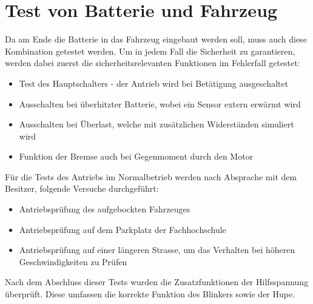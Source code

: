\section{Test von Batterie und Fahrzeug}
Da am Ende die Batterie in das Fahrzeug eingebaut werden soll, muss auch diese Kombination getestet werden. Um in jedem Fall die Sicherheit zu garantieren, werden dabei zuerst die sicherheitsrelevanten Funktionen im Fehlerfall getestet: \begin{itemize}
	\item Test des Hauptschalters - der Antrieb wird bei Betätigung ausgeschaltet
	\item Ausschalten bei überhitzter Batterie, wobei ein Sensor extern erwärmt wird
	\item Ausschalten bei Überlast, welche mit zusätzlichen Widerständen simuliert wird
	\item Funktion der Bremse auch bei Gegenmoment durch den Motor
\end{itemize}

Für die Tests des Antriebs im Normalbetrieb werden nach Absprache mit dem Besitzer, folgende Versuche durchgeführt: \begin{itemize}
	\item Antriebsprüfung des aufgebockten Fahrzeuges
	\item Antriebsprüfung auf dem Parkplatz der Fachhochschule
	\item Antriebsprüfung auf einer längeren Strasse, um das Verhalten bei höheren Geschwindigkeiten zu Prüfen
\end{itemize}

Nach dem Abschluss dieser Tests wurden die Zusatzfunktionen der Hilfsspannung überprüft. Diese umfassen die korrekte Funktion des Blinkers sowie der Hupe.

